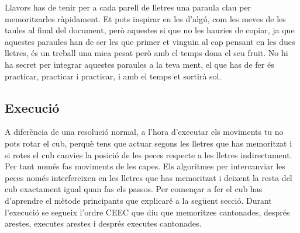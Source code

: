 Llavors has de tenir per a cada parell de lletres una paraula clau per memoritzarles ràpidament. Et pots inspirar en les d'algú, com les meves de les taules al final del document, però aquestes si que no les hauries de copiar, ja que aquestes paraules han de ser les que primer et vinguin al cap pensant en les dues lletres, és un treball una mica pesat però amb el temps dona el seu fruit.
No hi ha secret per integrar aquestes paraules a la teva ment, el que has de fer és practicar, practicar i practicar, i amb el temps et sortirà sol.


\subsection{Execució}

A diferència de una resolució normal, a l'hora d'executar els moviments tu no pots rotar el cub, perquè tens que actuar segons les lletres que has memoritzat i si rotes el cub canvies la posició de les peces respecte a les lletres indirectament.
Per tant només fas moviments de les capes. Els algoritmes per intercanviar les peces només interfereixen en les lletres que has memoritzat i deixent la resta del cub exactament igual quan fas els passos. Per començar a fer el cub has d'aprendre el mètode principants que explicaré a la següent secció.
Durant l'execució se segueix l'ordre CEEC que diu que memoritzes cantonades, després arestes, executes arestes i després executes cantonades.
